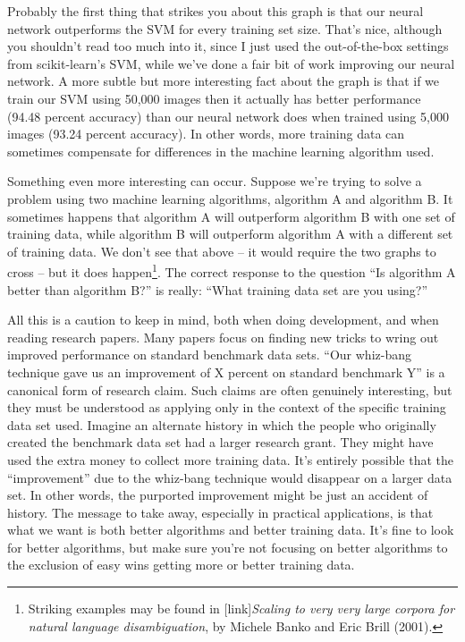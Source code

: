 \documentclass[a4paper,twoside,10pt]{book}
\begin{document}
Probably the first thing that strikes you about this graph is that our neural network outperforms the SVM for every training set size. That's nice, although you shouldn't read too much into it, since I just used the out-of-the-box settings from scikit-learn's SVM, while we've done a fair bit of work improving our neural network. A more subtle but more interesting fact about the graph is that if we train our SVM using 50,000 images then it actually has better performance (94.48 percent accuracy) than our neural network does when trained using 5,000 images (93.24 percent accuracy). In other words, more training data can sometimes compensate for differences in the machine learning algorithm used.

Something even more interesting can occur. Suppose we're trying to solve a problem using two machine learning algorithms, algorithm A and algorithm B. It sometimes happens that algorithm A will outperform algorithm B with one set of training data, while algorithm B will outperform algorithm A with a different set of training data. We don't see that above -- it would require the two graphs to cross -- but it does happen\footnote{Striking examples may be found in [link]\textit{Scaling to very very large corpora for natural language disambiguation}, by Michele Banko and Eric Brill (2001).}. The correct response to the question ``Is algorithm A better than algorithm B?'' is really: ``What training data set are you using?''

All this is a caution to keep in mind, both when doing development, and when reading research papers. Many papers focus on finding new tricks to wring out improved performance on standard benchmark data sets. ``Our whiz-bang technique gave us an improvement of X percent on standard benchmark Y'' is a canonical form of research claim. Such claims are often genuinely interesting, but they must be understood as applying only in the context of the specific training data set used. Imagine an alternate history in which the people who originally created the benchmark data set had a larger research grant. They might have used the extra money to collect more training data. It's entirely possible that the ``improvement'' due to the whiz-bang technique would disappear on a larger data set. In other words, the purported improvement might be just an accident of history. The message to take away, especially in practical applications, is that what we want is both better algorithms and better training data. It's fine to look for better algorithms, but make sure you're not focusing on better algorithms to the exclusion of easy wins getting more or better training data.
\end{document}
